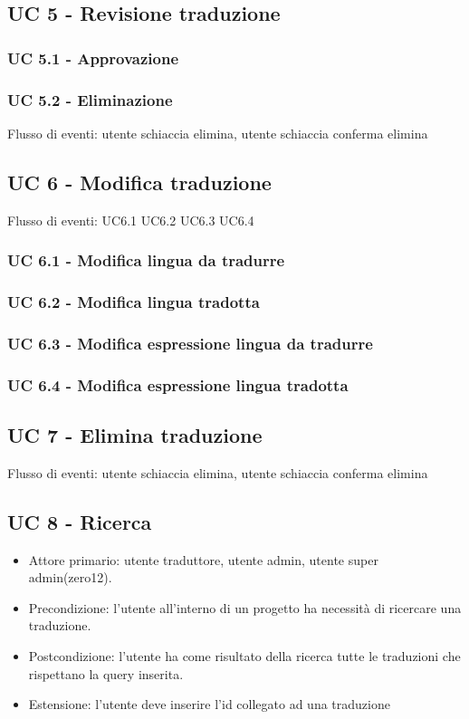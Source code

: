 \subsection{UC 5 - Revisione traduzione}
    \subsubsection{UC 5.1 - Approvazione}
    \subsubsection{UC 5.2 - Eliminazione}
    Flusso di eventi: utente schiaccia elimina, utente schiaccia conferma elimina
\subsection{UC 6 - Modifica traduzione}
Flusso di eventi: UC6.1 UC6.2 UC6.3 UC6.4   %
    \subsubsection{UC 6.1 - Modifica lingua da tradurre}
    \subsubsection{UC 6.2 - Modifica lingua tradotta}
    \subsubsection{UC 6.3 - Modifica espressione lingua da tradurre}
    \subsubsection{UC 6.4 - Modifica espressione lingua tradotta}
\subsection{UC 7 - Elimina traduzione} %
Flusso di eventi: utente schiaccia elimina, utente schiaccia conferma elimina
\subsection{UC 8 - Ricerca}
    \begin{itemize}
        \item Attore primario: utente traduttore, utente admin, utente super admin(zero12).
        \item Precondizione: l'utente all'interno di un progetto ha necessità di ricercare una traduzione.
        \item Postcondizione: l'utente ha come risultato della ricerca tutte le traduzioni che rispettano la query inserita.
        \item Estensione: l'utente deve inserire l'id collegato ad una traduzione
    \end{itemize}
